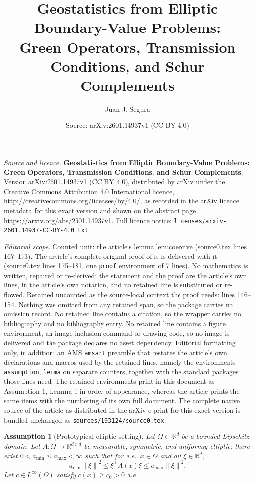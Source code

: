 \documentclass[10pt,a4paper]{amsart}
\title{\textbf{Geostatistics from Elliptic Boundary-Value Problems:}\\ \textbf{Green Operators, Transmission Conditions, and Schur Complements}}
\author{Juan J. Segura}
\date{Source: arXiv:2601.14937v1 (CC BY 4.0)}
\newtheorem{assumption}{Assumption}
\newcommand{\R}{\mathbb{R}}
\newcommand{\norm}[1]{\left\lVert #1\right\rVert}
\begin{document}
\maketitle

\noindent\emph{Source and licence.} \textbf{Geostatistics from Elliptic Boundary-Value Problems:}\\ \textbf{Green Operators, Transmission Conditions, and Schur Complements}. Version arXiv:2601.14937v1 (CC BY 4.0), distributed by arXiv under the Creative Commons Attribution 4.0 International licence, http://creativecommons.org/licenses/by/4.0/, as recorded in the arXiv licence metadata for this exact version and shown on the abstract page https://arxiv.org/abs/2601.14937v1. Full licence notice: \texttt{licenses/arxiv-2601.14937-CC-BY-4.0.txt}.\par\smallskip

\noindent\textit{Editorial scope.} Counted unit: the article's lemma lem:coercive (source0.tex lines 167--173). The article's complete original proof of it is delivered with it (source0.tex lines 175--181, one \texttt{proof} environment of 7 lines). No mathematics is written, repaired or re-derived: the statement and the proof are the article's own lines, in the article's own notation, and no retained line is substituted or re-flowed.  Retained uncounted as the source-local context the proof needs: lines 146--154.  Nothing was omitted from any retained span, so the package carries no omission record.  No retained line contains a citation, so the wrapper carries no bibliography and no bibliography entry.  No retained line contains a figure environment, an image-inclusion command or drawing code, so no image is delivered and the package declares no asset dependency.  Editorial formatting only, in addition: an AMS \texttt{amsart} preamble that restates the article's own declarations and macros used by the retained lines, namely the environments \texttt{assumption}, \texttt{lemma} on separate counters, together with the standard packages those lines need.  The retained environments print in this document as Assumption 1, Lemma 1 in order of appearance, whereas the article prints the same items with the numbering of its own full document.  The complete native source of the article as distributed in the arXiv e-print for this exact version is bundled unchanged as \texttt{sources/193124/source0.tex}.
\begin{assumption}[Prototypical elliptic setting]\label{ass:elliptic}
Let $\Omega\subset\R^d$ be a bounded Lipschitz domain.
Let $A:\Omega\to\R^{d\times d}$ be measurable, symmetric, and uniformly elliptic: there exist
$0<a_{\min}\le a_{\max}<\infty$ such that for a.e.\ $x\in\Omega$ and all $\xi\in\R^d$,
\[
a_{\min}\norm{\xi}^2 \le \xi^\top A(x)\xi \le a_{\max}\norm{\xi}^2.
\]
Let $c\in L^\infty(\Omega)$ satisfy $c(x)\ge c_0>0$ a.e.
\end{assumption}
\end{document}

